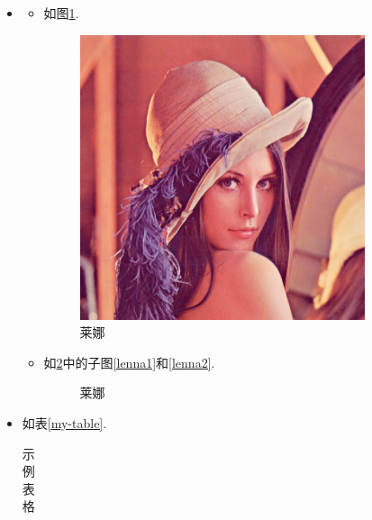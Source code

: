 \documentclass{assignment}
\begin{document}
    \begin{jie}
        \begin{itemize}
            \item[(1)]
            \begin{itemize}
                \item[(a)] 如图\ref{Lenna}.
                \begin{figure}[H]
                    \centering
                    \includegraphics[width=.2\textwidth]{Lenna.jpg}
                    \caption{莱娜}
                    \label{Lenna}
                \end{figure}
                \item[(b)] 如\ref{Lenna2}中的子图\ref{lenna1}和\ref{lenna2}.
                \begin{figure}[h]
                    \centering
                    \caption{莱娜}
                    \label{Lenna2}
                \end{figure}
            \end{itemize}
            \item[(2)] 如表\ref{my-table}.
            \begin{center}
                \begin{longtable}{ccccc}
                    \caption{示例表格}

\end{longtable}
\end{center}
\end{itemize}
\end{jie}
\end{document}
